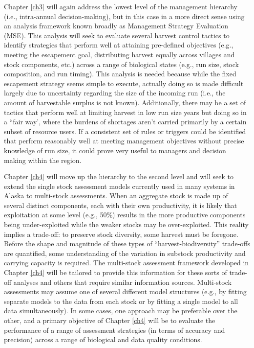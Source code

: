 \documentclass[12pt,]{book}
\theoremstyle{definition}
\theoremstyle{definition}
\theoremstyle{definition}
\theoremstyle{remark}
\begin{document}
Chapter \ref{ch3} will again address the lowest level of the management
hierarchy (i.e., intra-annual decision-making), but in this case in a
more direct sense using an analysis framework known broadly as
Management Strategy Evaluation (MSE). This analysis will seek to
evaluate several harvest control tactics to identify strategies that
perform well at attaining pre-defined objectives (e.g., meeting the
escapement goal, distributing harvest equally across villages and stock
components, etc.) across a range of biological states (e.g., run size,
stock composition, and run timing). This analysis is needed because
while the fixed escapement strategy seems simple to execute, actually
doing so is made difficult largely due to uncertainty regarding the size
of the incoming run (i.e., the amount of harvestable surplus is not
known). Additionally, there may be a set of tactics that perform well at
limiting harvest in low run size years but doing so in a ``fair way',
where the burdens of shortages aren't carried primarily by a certain
subset of resource users. If a consistent set of rules or triggers could
be identified that perform reasonably well at meeting management
objectives without precise knowledge of run size, it could prove very
useful to managers and decision making within the region.

Chapter \ref{ch4} will move up the hierarchy to the second level and
will seek to extend the single stock assessment models currently used in
many systems in Alaska to multi-stock assessments. When an aggregate
stock is made up of several distinct components, each with their own
productivity, it is likely that exploitation at some level (e.g., 50\%)
results in the more productive components being under-exploited while
the weaker stocks may be over-exploited. This reality implies a
trade-off: to preserve stock diversity, some harvest must be foregone.
Before the shape and magnitude of these types of
``harvest-biodiversity'' trade-offs are quantified, some understanding
of the variation in substock productivity and carrying capacity is
required. The multi-stock assessment framework developed in Chapter
\ref{ch4} will be tailored to provide this information for these sorts
of trade-off analyses and others that require similar information
sources. Multi-stock assessments may assume one of several different
model structures (e.g., by fitting separate models to the data from each
stock or by fitting a single model to all data simultaneously). In some
cases, one approach may be preferable over the other, and a primary
objective of Chapter \ref{ch4} will be to evaluate the performance of a
range of assessment strategies (in terms of accuracy and precision)
across a range of biological and data quality conditions.
\end{document}
